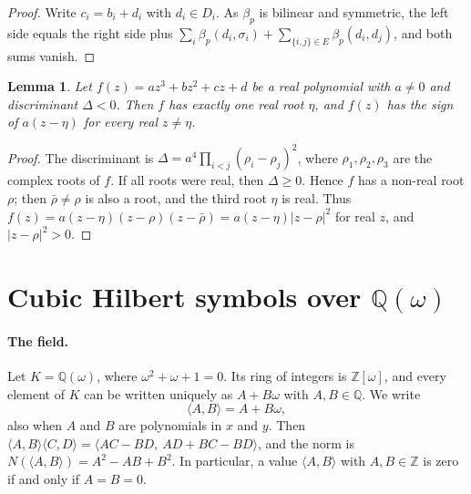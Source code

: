 \documentclass[11pt]{article}
\newtheorem{lemma}[theorem]{Lemma}
\newcommand{\Z}{\mathbb{Z}}
\newcommand{\Q}{\mathbb{Q}}
\begin{document}
\begin{proof}
Write $c_i=b_i+d_i$ with $d_i\in D_i$. As $\beta_p$ is bilinear and symmetric, the left side equals the right side plus $\sum_i\beta_p(d_i,\sigma_i)+\sum_{\{i,j\}\in E}\beta_p(d_i,d_j)$, and both sums vanish.
\end{proof}

\begin{lemma}\label{lem:cubic}
Let $f(z)=az^3+bz^2+cz+d$ be a real polynomial with $a\neq0$ and discriminant $\Delta<0$. Then $f$ has exactly one real root $\eta$, and $f(z)$ has the sign of $a(z-\eta)$ for every real $z\neq\eta$.
\end{lemma}

\begin{proof}
The discriminant is $\Delta=a^4\prod_{i<j}(\rho_i-\rho_j)^2$, where $\rho_1,\rho_2,\rho_3$ are the complex roots of $f$. If all roots were real, then $\Delta\geq0$. Hence $f$ has a non-real root $\rho$; then $\bar\rho\neq\rho$ is also a root, and the third root $\eta$ is real. Thus $f(z)=a(z-\eta)(z-\rho)(z-\bar\rho)=a(z-\eta)|z-\rho|^2$ for real $z$, and $|z-\rho|^2>0$.
\end{proof}



\section{\texorpdfstring{Cubic Hilbert symbols over $\Q(\omega)$}{Cubic Hilbert symbols over Q(w)}}\label{sec:csymbols}

\paragraph{The field.} Let $K=\Q(\omega)$, where $\omega^2+\omega+1=0$. Its ring of integers is $\Z[\omega]$, and every element of $K$ can be written uniquely as $A+B\omega$ with $A,B\in\Q$. We write
\[
\langle A,B\rangle=A+B\omega,
\]
also when $A$ and $B$ are polynomials in $x$ and $y$. Then $\langle A,B\rangle\langle C,D\rangle=\langle AC-BD,\ AD+BC-BD\rangle$, and the norm is $N(\langle A,B\rangle)=A^2-AB+B^2$. In particular, a value $\langle A,B\rangle$ with $A,B\in\Z$ is zero if and only if $A=B=0$.
\end{document}
